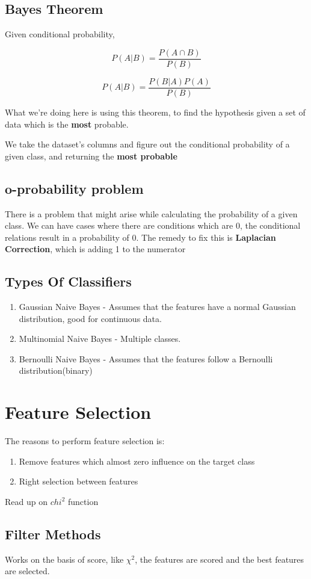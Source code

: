 \documentclass[11pt]{article}
\begin{document}
\subsection{Bayes Theorem}
\label{sec:org9c10bf3}
Given conditional probability,

$$P(A|B) = \frac{P(A \cap B)}{P(B)}$$

$$P(A|B) = \frac{P(B|A) P (A)}{P(B)}$$

What we're doing here is using this theorem, to find the hypothesis given a set of data which is the \textbf{most} probable.

We take the dataset's columns and figure out the conditional probability of a given class, and returning the \textbf{most probable}
\subsection{o-probability problem}
\label{sec:org6ee7478}
There is a problem that might arise while calculating the probability of a given class.
We can have cases where there are conditions which are 0, the conditional relations result in a probability of 0. The remedy to fix this is \textbf{Laplacian Correction}, which is adding 1 to the numerator
\subsection{Types Of Classifiers}
\label{sec:org3cf2302}
\begin{enumerate}
\item Gaussian Naive Bayes - Assumes that the features have a normal Gaussian distribution, good for continuous data.
\item Multinomial Naive Bayes - Multiple classes.
\item Bernoulli Naive Bayes - Assumes that the features follow a Bernoulli distribution(binary)
\end{enumerate}
\section{Feature Selection}
\label{sec:orgad5e57d}
The reasons to perform feature selection is:
\begin{enumerate}
\item Remove features which almost zero influence on the target class
\item Right selection between features
\end{enumerate}

Read up on \(chi^2\) function
\subsection{Filter Methods}
\label{sec:orgfcfe610}
Works on the basis of score, like \(\chi^{2}\), the features are scored and the best features are selected.
\end{document}
